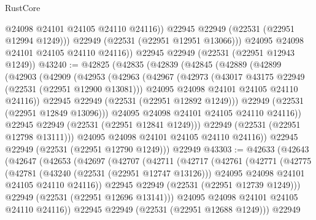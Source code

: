 \begin{lexlean}{RustCore}
\begin{coremodule}
                @24098
                @24101
                @24105
                @24110
                @24116))
            @22945
            @22949
            (@22531 (@22951 @12994 @1249)))
          @22949
          (@22531 (@22951 @12951 @13066)))
        @24095
        @24098
        @24101
        @24105
        @24110
        @24116))
    @22945
    @22949
    (@22531 (@22951 @12943 @1249))
@43240 := @42825
    (@42835
      (@42839
        (@42845
          (@42889
            (@42899
              (@42903
                (@42909
                  (@42953
                    (@42963
                      (@42967
                        (@42973
                          (@43017 @43175 @22949 (@22531 (@22951 @12900 @13081)))
                          @24095
                          @24098
                          @24101
                          @24105
                          @24110
                          @24116))
                      @22945
                      @22949
                      (@22531 (@22951 @12892 @1249)))
                    @22949
                    (@22531 (@22951 @12849 @13096)))
                  @24095
                  @24098
                  @24101
                  @24105
                  @24110
                  @24116))
              @22945
              @22949
              (@22531 (@22951 @12841 @1249)))
            @22949
            (@22531 (@22951 @12798 @13111)))
          @24095
          @24098
          @24101
          @24105
          @24110
          @24116))
      @22945
      @22949
      (@22531 (@22951 @12790 @1249)))
    @22949
@43303 := @42633
    (@42643
      (@42647
        (@42653
          (@42697
            (@42707
              (@42711
                (@42717
                  (@42761
                    (@42771
                      (@42775
                        (@42781
                          (@43240 (@22531 (@22951 @12747 @13126)))
                          @24095
                          @24098
                          @24101
                          @24105
                          @24110
                          @24116))
                      @22945
                      @22949
                      (@22531 (@22951 @12739 @1249)))
                    @22949
                    (@22531 (@22951 @12696 @13141)))
                  @24095
                  @24098
                  @24101
                  @24105
                  @24110
                  @24116))
              @22945
              @22949
              (@22531 (@22951 @12688 @1249)))
            @22949

\end{coremodule}
\end{lexlean}
